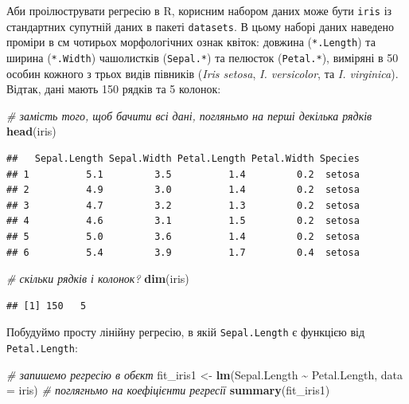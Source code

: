 \documentclass[
  11pt,
]{book}
\newenvironment{Shaded}{\begin{snugshade}}{\end{snugshade}}
\newcommand{\AttributeTok}[1]{\textcolor[rgb]{0.13,0.29,0.53}{#1}}
\newcommand{\CommentTok}[1]{\textcolor[rgb]{0.56,0.35,0.01}{\textit{#1}}}
\newcommand{\FunctionTok}[1]{\textcolor[rgb]{0.13,0.29,0.53}{\textbf{#1}}}
\newcommand{\NormalTok}[1]{#1}
\newcommand{\OtherTok}[1]{\textcolor[rgb]{0.56,0.35,0.01}{#1}}
\newcommand{\SpecialCharTok}[1]{\textcolor[rgb]{0.81,0.36,0.00}{\textbf{#1}}}
\begin{document}
Аби проілюструвати регресію в R, корисним набором даних може бути \texttt{iris} із стандартних супутній даних в пакеті \texttt{datasets}. В цьому наборі даних наведено проміри в см чотирьох морфологічних ознак квіток: довжина (\texttt{*.Length}) та ширина (\texttt{*.Width}) чашолистків (\texttt{Sepal.*}) та пелюсток (\texttt{Petal.*}), виміряні в 50 особин кожного з трьох видів півників (\emph{Iris setosa}, \emph{I. versicolor}, та \emph{I. virginica}). Відтак, дані мають 150 рядків та 5 колонок:

\begin{Shaded}
\begin{Highlighting}[]
\CommentTok{\# замість того, щоб бачити всі дані, погляньмо на перші декілька рядків}
\FunctionTok{head}\NormalTok{(iris)}
\end{Highlighting}
\end{Shaded}

\begin{verbatim}
##   Sepal.Length Sepal.Width Petal.Length Petal.Width Species
## 1          5.1         3.5          1.4         0.2  setosa
## 2          4.9         3.0          1.4         0.2  setosa
## 3          4.7         3.2          1.3         0.2  setosa
## 4          4.6         3.1          1.5         0.2  setosa
## 5          5.0         3.6          1.4         0.2  setosa
## 6          5.4         3.9          1.7         0.4  setosa
\end{verbatim}

\begin{Shaded}
\begin{Highlighting}[]
\CommentTok{\# скільки рядків і колонок?}
\FunctionTok{dim}\NormalTok{(iris)}
\end{Highlighting}
\end{Shaded}

\begin{verbatim}
## [1] 150   5
\end{verbatim}

Побудуймо просту лінійну регресію, в якій \texttt{Sepal.Length} є функцією від \texttt{Petal.Length}:

\begin{Shaded}
\begin{Highlighting}[]
\CommentTok{\# запишемо регресію в об\textquotesingle{}єкт}
\NormalTok{fit\_iris1 }\OtherTok{\textless{}{-}} \FunctionTok{lm}\NormalTok{(Sepal.Length }\SpecialCharTok{\textasciitilde{}}\NormalTok{ Petal.Length, }\AttributeTok{data =}\NormalTok{ iris)}
\CommentTok{\# поглягньмо на коефіцієнти регресії}
\FunctionTok{summary}\NormalTok{(fit\_iris1)}
\end{Highlighting}
\end{Shaded}
\end{document}
